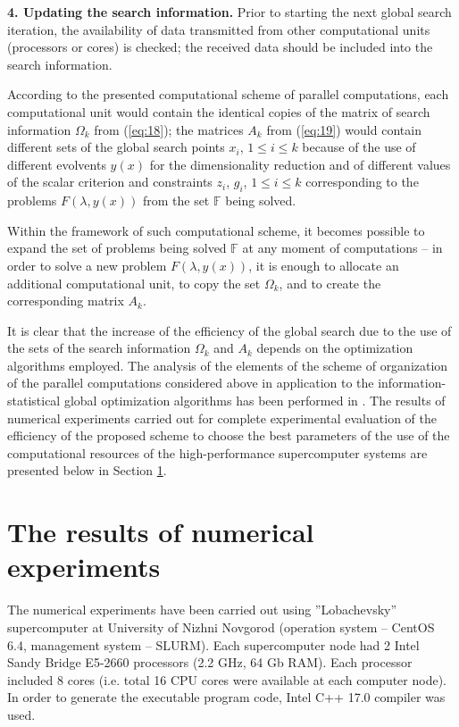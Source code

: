 \documentclass{svproc}
\begin{document}
\textbf{4. Updating the search information.} Prior to starting the next global search iteration, the availability of data transmitted from other computational units (processors or cores) is checked; the received data should be included into the search information.

According to the presented computational scheme of parallel computations, each computational unit would contain the identical copies of the matrix of search information $\Omega_k$ from (\ref{eq:18}); the matrices $A_k$ from (\ref{eq:19}) would contain different sets of the global search points $x_i$, $1\leq i\leq k$ because of the use of different evolvents $y(x)$ for the dimensionality reduction and of different values of the scalar criterion and constraints $z_i$, $g_i$, $1\leq i\leq k$ corresponding to the problems $F(\lambda,y(x))$ from the set $\mathbb{F}$ being solved.

Within the framework of such computational scheme, it becomes possible to expand the set of problems being solved $\mathbb{F}$ at any moment of computations -- in order to solve a new problem $F(\lambda,y(x))$, it is enough to allocate an additional computational unit, to copy the set $\Omega_k$, and to create the corresponding matrix $A_k$.

It is clear that the increase of the efficiency of the global search due to the use of the sets of the search information $\Omega_k$ and $A_k$ depends on the optimization algorithms employed. The analysis of the elements of the scheme of organization of the parallel computations considered above in application to the information-statistical global optimization algorithms has been performed in \cite{x12,x13,x14,x15,x16,x17}. The results of numerical experiments carried out for complete experimental evaluation of the efficiency of the proposed scheme to choose the best parameters of the use of the computational resources of the high-performance supercomputer systems are presented below in Section \ref{sec:06}.



\section{The results of numerical experiments }
\label{sec:06}

The numerical experiments have been carried out using ''Lobachevsky'' supercomputer at University of Nizhni Novgorod (operation system -- CentOS 6.4, management system -- SLURM). Each supercomputer node had 2 Intel Sandy Bridge E5-2660 processors (2.2 GHz, 64 Gb RAM). Each processor included 8 cores (i.e. total 16 CPU cores were available at each computer node). In order to generate the executable program code, Intel C++ 17.0 compiler was used.
\end{document}
